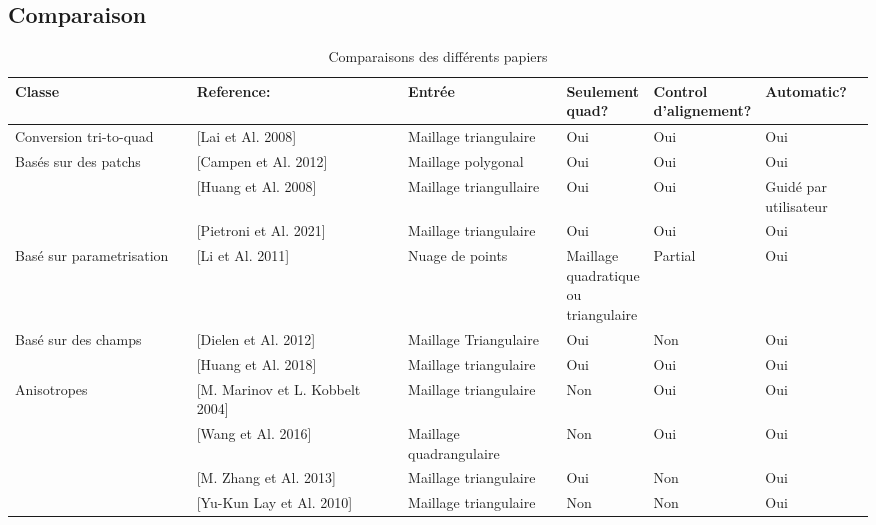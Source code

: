 \documentclass[runningheads]{llncs}
\begin{document}
\subsection{Comparaison}
\begin{table}[!htp]\centering
\caption{Comparaisons des différents papiers}\label{tab: }
\scriptsize
\hspace*{-3cm}
\begin{tabular}{|p{0.30\linewidth}|p{0.40\linewidth}|p{0.25\linewidth}|p{0.15\linewidth}|p{0.15\linewidth}|p{0.15\linewidth}|p{0.15\linewidth}|}
\hline
Classe &Reference: &Entrée &Seulement quad? &Control d'alignement? &Automatic? \\
\hline
Conversion tri-to-quad &[Lai et Al. 2008] &Maillage triangulaire &Oui &Oui &Oui \\
\hline
Basés sur des patchs &[Campen et Al. 2012] &Maillage polygonal &Oui &Oui &Oui \\
\hline
&[Huang et Al. 2008] &Maillage triangullaire &Oui &Oui &Guidé par utilisateur \\
\hline
&[Pietroni et Al. 2021] &Maillage triangulaire &Oui &Oui &Oui \\
\hline
Basé sur parametrisation &[Li et Al. 2011] &Nuage de points &Maillage quadratique ou triangulaire &Partial &Oui \\
\hline
Basé sur des champs &[Dielen et Al. 2012] &Maillage Triangulaire &Oui &Non &Oui \\
\hline
&[Huang et Al. 2018] &Maillage triangulaire &Oui &Oui &Oui \\
\hline
Anisotropes &[M. Marinov et L. Kobbelt 2004]&Maillage triangulaire &Non &Oui &Oui \\
\hline
&[Wang et Al. 2016] &Maillage quadrangulaire &Non &Oui &Oui \\
\hline
&[M. Zhang et Al. 2013]&Maillage triangulaire &Oui &Non &Oui \\
\hline
&[Yu-Kun Lay et Al. 2010]&Maillage triangulaire &Non &Non &Oui \\
\hline

\end{tabular}
\end{table}
\end{document}
